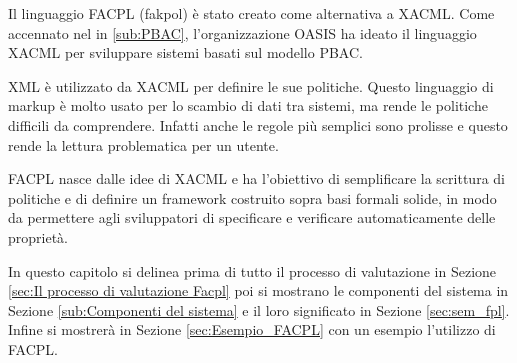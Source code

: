 \label{chap:Formal Access Control Policy Language}
Il linguaggio \ac{FACPL} (fakpol) è stato creato come alternativa a \ac{XACML}. Come accennato nel in \ref{sub:PBAC},
l'organizzazione \ac{OASIS} ha ideato il linguaggio \ac{XACML} per sviluppare sistemi basati sul modello \ac{PBAC}.\par
\ac{XML} è utilizzato da \ac{XACML} per definire le sue politiche. Questo linguaggio di markup è molto usato per lo scambio
di dati tra sistemi, ma rende le politiche difficili da comprendere. Infatti anche le regole più semplici sono prolisse
e questo rende la lettura problematica per un utente.\par
\ac{FACPL} nasce dalle idee di \ac{XACML} e ha l'obiettivo di semplificare la scrittura di politiche e di definire un framework
costruito sopra basi formali solide, in modo da permettere agli sviluppatori di specificare e verificare automaticamente
delle proprietà.

In questo capitolo si delinea prima di tutto il processo di valutazione in Sezione \ref{sec:Il processo di valutazione Facpl}
poi si mostrano le componenti del sistema in Sezione \ref{sub:Componenti del sistema} e il loro significato in Sezione \ref{sec:sem_fpl}. Infine si
mostrerà in Sezione \ref{sec:Esempio_FACPL} con un esempio l'utilizzo di \ac{FACPL}.
